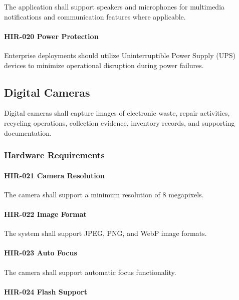 The application shall support speakers and microphones for multimedia
notifications and communication features where applicable.

\paragraph{HIR-020 Power Protection}

Enterprise deployments should utilize Uninterruptible Power Supply
(UPS) devices to minimize operational disruption during power failures.


\subsection{Digital Cameras}

Digital cameras shall capture images of electronic waste, repair
activities, recycling operations, collection evidence, inventory
records, and supporting documentation.


\subsubsection*{Hardware Requirements}

\paragraph{HIR-021 Camera Resolution}

The camera shall support a minimum resolution of 8 megapixels.

\paragraph{HIR-022 Image Format}

The system shall support JPEG, PNG, and WebP image formats.

\paragraph{HIR-023 Auto Focus}

The camera shall support automatic focus functionality.

\paragraph{HIR-024 Flash Support}

